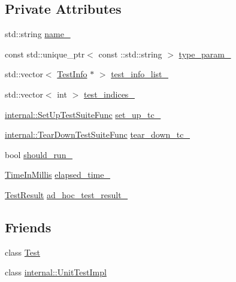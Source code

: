 \subsection*{Private Attributes}
\begin{DoxyCompactItemize}
\item 
std\+::string \hyperlink{classtesting_1_1TestSuite_a46e3ab93d0ee8885c5348b0de145cd9b}{name\+\_\+}
\item 
const std\+::unique\+\_\+ptr$<$ const \+::std\+::string $>$ \hyperlink{classtesting_1_1TestSuite_a64f4695713d1f8e416472016f265f76e}{type\+\_\+param\+\_\+}
\item 
std\+::vector$<$ \hyperlink{classtesting_1_1TestInfo}{Test\+Info} $\ast$ $>$ \hyperlink{classtesting_1_1TestSuite_a685150382823f5711d4bcf4e208f6a1f}{test\+\_\+info\+\_\+list\+\_\+}
\item 
std\+::vector$<$ int $>$ \hyperlink{classtesting_1_1TestSuite_ab62db5c2a93d2c1099d7282977df6701}{test\+\_\+indices\+\_\+}
\item 
\hyperlink{namespacetesting_1_1internal_a83e4e0732ac6a9dcfe6ee299dc1b9fa2}{internal\+::\+Set\+Up\+Test\+Suite\+Func} \hyperlink{classtesting_1_1TestSuite_a67f2469764b1e9ca0c3c6458d13876ad}{set\+\_\+up\+\_\+tc\+\_\+}
\item 
\hyperlink{namespacetesting_1_1internal_a8257a87aa42cebaa54b0c48a6ae657a5}{internal\+::\+Tear\+Down\+Test\+Suite\+Func} \hyperlink{classtesting_1_1TestSuite_a20c1697fd783f2b2a9069803ff991891}{tear\+\_\+down\+\_\+tc\+\_\+}
\item 
bool \hyperlink{classtesting_1_1TestSuite_a15749716f1d6b91d6b9e735e662c6d2c}{should\+\_\+run\+\_\+}
\item 
\hyperlink{namespacetesting_a992de1d091ce660f451d1e8b3ce30fd6}{Time\+In\+Millis} \hyperlink{classtesting_1_1TestSuite_aec25aff7c1e837c236e060736e61bea4}{elapsed\+\_\+time\+\_\+}
\item 
\hyperlink{classtesting_1_1TestResult}{Test\+Result} \hyperlink{classtesting_1_1TestSuite_ac2b1629cb484d874f4cfc12a18e04d90}{ad\+\_\+hoc\+\_\+test\+\_\+result\+\_\+}
\end{DoxyCompactItemize}
\subsection*{Friends}
\begin{DoxyCompactItemize}
\item 
class \hyperlink{classtesting_1_1TestSuite_a5b78b1c2e1fa07ffed92da365593eaa4}{Test}
\item 
class \hyperlink{classtesting_1_1TestSuite_acc0a5e7573fd6ae7ad1878613bb86853}{internal\+::\+Unit\+Test\+Impl}
\end{DoxyCompactItemize}


